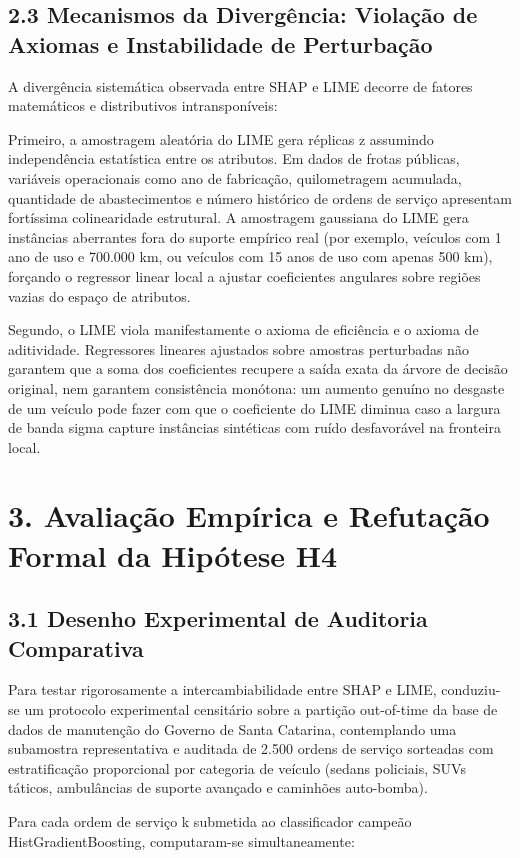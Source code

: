 \documentclass[10pt,a4paper,journal]{article}
\begin{document}
\subsection{2.3 Mecanismos da Divergência: Violação de Axiomas e Instabilidade de Perturbação}
A divergência sistemática observada entre SHAP e LIME decorre de fatores matemáticos e distributivos intransponíveis:

Primeiro, a amostragem aleatória do LIME gera réplicas z assumindo independência estatística entre os atributos. Em dados de frotas públicas, variáveis operacionais como ano de fabricação, quilometragem acumulada, quantidade de abastecimentos e número histórico de ordens de serviço apresentam fortíssima colinearidade estrutural. A amostragem gaussiana do LIME gera instâncias aberrantes fora do suporte empírico real (por exemplo, veículos com 1 ano de uso e 700.000 km, ou veículos com 15 anos de uso com apenas 500 km), forçando o regressor linear local a ajustar coeficientes angulares sobre regiões vazias do espaço de atributos.

Segundo, o LIME viola manifestamente o axioma de eficiência e o axioma de aditividade. Regressores lineares ajustados sobre amostras perturbadas não garantem que a soma dos coeficientes recupere a saída exata da árvore de decisão original, nem garantem consistência monótona: um aumento genuíno no desgaste de um veículo pode fazer com que o coeficiente do LIME diminua caso a largura de banda sigma capture instâncias sintéticas com ruído desfavorável na fronteira local.

\section{3. Avaliação Empírica e Refutação Formal da Hipótese H4}
\subsection{3.1 Desenho Experimental de Auditoria Comparativa}
Para testar rigorosamente a intercambiabilidade entre SHAP e LIME, conduziu-se um protocolo experimental censitário sobre a partição out-of-time da base de dados de manutenção do Governo de Santa Catarina, contemplando uma subamostra representativa e auditada de 2.500 ordens de serviço sorteadas com estratificação proporcional por categoria de veículo (sedans policiais, SUVs táticos, ambulâncias de suporte avançado e caminhões auto-bomba).

Para cada ordem de serviço k submetida ao classificador campeão HistGradientBoosting, computaram-se simultaneamente:
\end{document}
